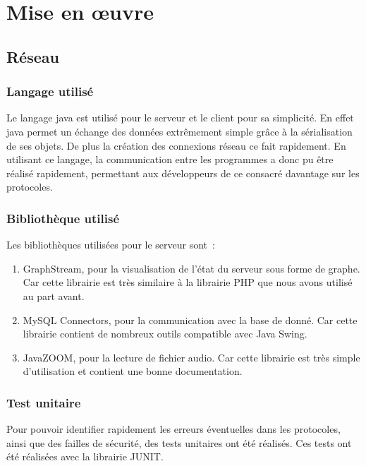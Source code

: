 \documentclass[a4paper,11pt]{report}
\title{}
\author{}
\begin{document}
\maketitle
\tableofcontents

\begin{abstract}
\end{abstract}

\chapter{Mise en œuvre}

\section{Réseau}

\subsection{Langage utilisé}
Le langage java est utilisé pour le serveur et le client pour sa simplicité. En effet java permet un échange des données extrêmement simple grâce à la sérialisation de ses objets. De plus la création des connexions réseau ce fait rapidement.
En utilisant ce langage, la communication entre les programmes a donc pu être réalisé rapidement, permettant aux développeurs de ce consacré davantage sur les protocoles.

\subsection{Bibliothèque utilisé}
Les bibliothèques utilisées pour le serveur sont :
\begin{enumerate}
  \item GraphStream, pour la visualisation de l'état du serveur sous forme de graphe. Car cette librairie est très similaire à la librairie PHP que nous avons utilisé au part avant.
  \item MySQL Connectors, pour la communication avec la base de donné. Car cette librairie contient de nombreux outils compatible avec Java Swing.
  \item JavaZOOM, pour la lecture de fichier audio. Car cette librairie est très simple d’utilisation et contient une bonne documentation.
\end{enumerate}

\subsection{Test unitaire}
Pour pouvoir identifier rapidement les erreurs éventuelles dans les protocoles, ainsi que des failles de sécurité, des tests unitaires ont été réalisés. Ces tests ont été réalisées avec la librairie JUNIT. 
\end{document}
